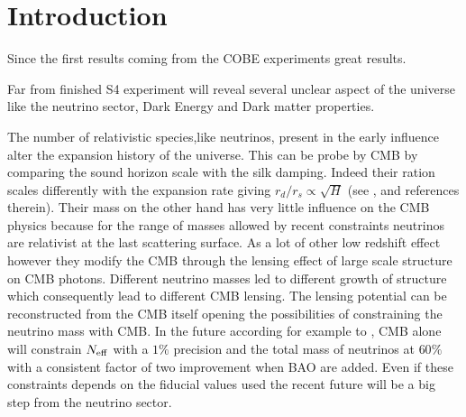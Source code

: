 \documentclass[aps,prl,preprint,groupedaddress]{revtex4-1}
\begin{document}
\pacs{}

\maketitle

\section{Introduction \label{sec:intro}}

Since the first results coming from the COBE experiments great results.

Far from finished S4 experiment will reveal several unclear aspect of the universe like the neutrino sector, Dark Energy and Dark matter properties. 


The number of relativistic species,like neutrinos, present in the early influence alter the expansion history of the universe. This can be probe by CMB by comparing the sound horizon scale with the silk damping. Indeed their ration scales differently with the expansion rate giving $r_{d}/r_{s}\propto\sqrt{H}$ (see \cite{2013arXiv1309.5383A}, \cite{2013PhRvD..87h3008H} and references therein). Their mass on the other hand has very little influence on the CMB physics because for the range of masses allowed by recent constraints neutrinos are relativist at the last scattering surface. As a lot of other low redshift effect however they modify the CMB through the lensing effect of large scale structure on CMB photons. Different neutrino masses led to different growth of structure which consequently lead to different CMB lensing. The lensing potential can be reconstructed from the CMB itself opening the possibilities of constraining the neutrino mass with CMB. In the future according for example to \cite{wu:2014}, CMB alone will constrain $N_{\rm eff}$ with a $1\%$ precision and the total mass of neutrinos at $60\%$ with a consistent factor of two improvement when BAO are added. Even if these constraints depends on the fiducial values used the recent future will be a big step from the neutrino sector.
\end{document}
